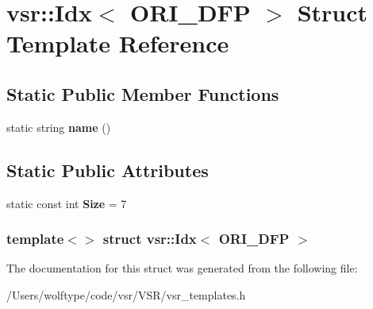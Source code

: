 \hypertarget{structvsr_1_1_idx_3_01_o_r_i___d_f_p_01_4}{\section{vsr\-:\-:Idx$<$ O\-R\-I\-\_\-\-D\-F\-P $>$ Struct Template Reference}
\label{structvsr_1_1_idx_3_01_o_r_i___d_f_p_01_4}
}
\subsection*{Static Public Member Functions}
\begin{DoxyCompactItemize}
\item 
\hypertarget{structvsr_1_1_idx_3_01_o_r_i___d_f_p_01_4_a128f90cd883fc81eedbf14c6e1417246}{static string {\bfseries name} ()}\label{structvsr_1_1_idx_3_01_o_r_i___d_f_p_01_4_a128f90cd883fc81eedbf14c6e1417246}

\end{DoxyCompactItemize}
\subsection*{Static Public Attributes}
\begin{DoxyCompactItemize}
\item 
\hypertarget{structvsr_1_1_idx_3_01_o_r_i___d_f_p_01_4_a9210dcf72b88a086288340acbd336df5}{static const int {\bfseries Size} = 7}\label{structvsr_1_1_idx_3_01_o_r_i___d_f_p_01_4_a9210dcf72b88a086288340acbd336df5}

\end{DoxyCompactItemize}
\subsubsection*{template$<$$>$ struct vsr\-::\-Idx$<$ O\-R\-I\-\_\-\-D\-F\-P $>$}



The documentation for this struct was generated from the following file\-:\begin{DoxyCompactItemize}
\item 
/\-Users/wolftype/code/vsr/\-V\-S\-R/vsr\-\_\-templates.\-h\end{DoxyCompactItemize}
